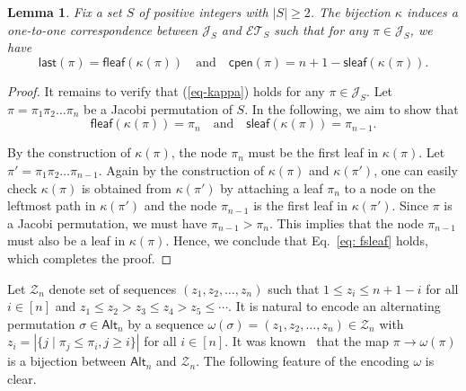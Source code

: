 \documentclass[12pt]{article}
\numberwithin{equation}{section}
\theoremstyle{plain}
\newtheorem{lemma}[theorem]{Lemma}
\def\Alt{\mathsf{Alt}}
\def\fleaf{\mathsf{fleaf}}
\def\sleaf{\mathsf{sleaf}}
\def\cpen{\mathsf{cpen}}
\def\last{\mathsf{last}}
\begin{document}
  
  \begin{lemma}\label{lem-kappa}
  	Fix a set $S$ of positive  integers with $|S|\geq 2$. The bijection $\kappa$ induces a one-to-one correspondence between $\mathcal{J}_S$ and $\mathcal{ET}_{S}$ such that for any $\pi\in \mathcal{J}_S$, we have 
  	\begin{equation}\label{eq-kappa}
  		\last(\pi)=\fleaf(\kappa(\pi))\quad\text{and}\quad\cpen(\pi)=n+1-\sleaf(\kappa(\pi)).
  	\end{equation}
  \end{lemma}
  \begin{proof}
  	It remains to verify that (\ref{eq-kappa}) holds for  any $\pi\in \mathcal{J}_S$.  	Let $\pi=\pi_1\pi_2\ldots \pi_n$ be a Jacobi permutation of $S$. In the following, we aim to show  that 	
	\begin{equation}\label{eq: fsleaf}
	\fleaf(\kappa(\pi))=\pi_n\quad\text{and}\quad \sleaf(\kappa(\pi))=\pi_{n-1}.
	\end{equation}
  	
  	
  	
  	By the construction of $\kappa(\pi)$, the node $\pi_n$ must be the first leaf in $\kappa(\pi)$.  
  	Let   $\pi'=\pi_1\pi_2\ldots \pi_{n-1}$. Again by the construction of $\kappa(\pi)$ and $\kappa(\pi')$, one can easily check  $\kappa(\pi)$ is obtained from $\kappa(\pi')$  by attaching a   leaf $\pi_n$ to a node on the leftmost path  in $\kappa(\pi')$ and the node  $\pi_{n-1}$ is the first leaf in $\kappa(\pi')$.     Since $\pi$ is a Jacobi permutation, we must have  $\pi_{n-1}>\pi_n$. This   implies that the node $\pi_{n-1}$ must also be a leaf in  $\kappa(\pi)$.   Hence, we conclude that Eq.~\eqref{eq: fsleaf} holds, which completes the proof.  
  \end{proof}
  
  Let $\mathcal{Z}_n$ denote set of sequences $(z_1, z_2, \ldots, z_n)$ such that
   $1\leq z_i\leq n+1-i$ for all $i\in[n]$ and  $z_1\leq z_2>z_3\leq z_4>z_5\leq\cdots $.
  It is natural to encode an alternating permutation $\sigma\in \Alt_{n}$ by a sequence $\omega(\sigma)=(z_1, z_2, \ldots, z_n) \in \mathcal{Z}_n$ with $z_i=|\{j\mid \pi_j\leq \pi_i, j\geq i\}|$  for all $i\in[n]$.   It was known~\cite{KPP} that the map $\pi\rightarrow \omega(\pi)$ is a bijection between $\Alt_n$ and $\mathcal{Z}_n$. The following feature of the encoding $\omega$ is clear. 
  
\end{document}
